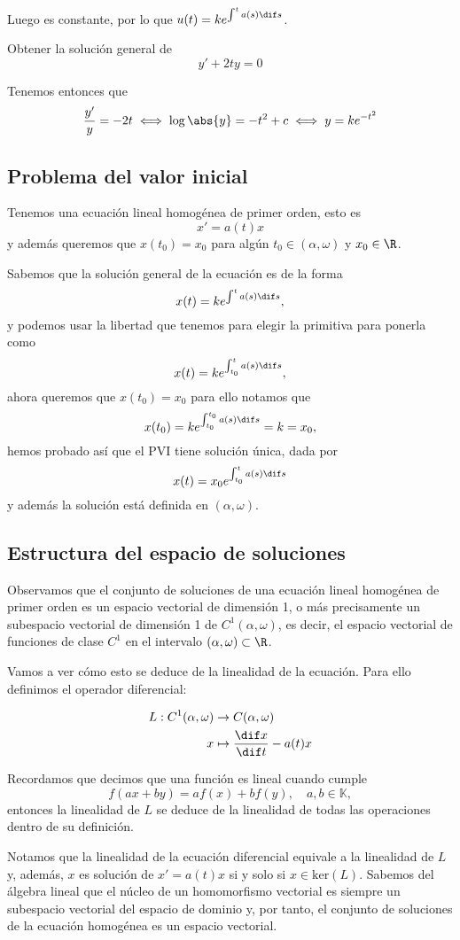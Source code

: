\documentclass[../main.tex]{subfiles}
\begin{document}
Luego es constante, por lo que \(u(t) = k e^{\int^t a(s) \dif s}\).

\begin{example}
	Obtener la solución general de
	\[y' + 2ty = 0\]
\end{example}

\begin{solution}
	Tenemos entonces que
	\[\frac{y'}{y} = -2t \iff \log\abs{y} = -t^2 + c \iff y = k e^{-t^2}\]
\end{solution}

\subsection{Problema del valor inicial}

Tenemos una ecuación lineal homogénea de primer orden, esto es
\[x' = a(t)x\]
y además queremos que \(x(t_0) = x_0\) para algún \(t_0 \in (\alpha, \omega)\) y
\(x_0 \in \R\).

Sabemos que la solución general de la ecuación es de la forma
\[x(t) = k e^{\int^t a(s) \dif s},\]
y podemos usar la libertad que tenemos para elegir la primitiva para ponerla como
\[x(t) = k e^{\int_{t_0}^t a(s) \dif s},\]
ahora queremos que \(x(t_0) = x_0\) para ello notamos que
\[x(t_0) = k e^{\int_{t_0}^{t_0} a(s) \dif s} = k = x_0,\]
hemos probado así que el PVI tiene solución única, dada por
\[x(t) = x_0 e^{\int_{t_0}^t a(s) \dif s}\]
y además la solución está definida en \((\alpha, \omega)\).

\subsection{Estructura del espacio de soluciones}

Observamos que el conjunto de soluciones de una ecuación lineal homogénea de
primer orden es un espacio vectorial de dimensión 1, o más precisamente un
subespacio vectorial de dimensión 1 de \(C^1(\alpha, \omega)\), es decir, el
espacio vectorial de funciones de clase \(C^1\) en el intervalo
\((\alpha, \omega) \subset \R\).

Vamos a ver cómo esto se deduce de la linealidad de la ecuación. Para ello
definimos el operador diferencial:

\begin{align*}
  L : C^1(\alpha, \omega) &\to C(\alpha, \omega) \\
  x &\mapsto \frac{\dif x}{\dif t} - a(t)x
\end{align*}

Recordamos que decimos que una función es lineal cuando cumple
\[f(ax + by) = af(x) + bf(y), \quad a, b \in \mathbb{K},\]
entonces la linealidad de \(L\) se deduce de la linealidad de todas las
operaciones dentro de su definición.

Notamos que la linealidad de la ecuación diferencial equivale a la linealidad de
\(L\) y, además, \(x\) es solución de \(x' = a(t)x\) si y solo si
\(x \in \text{ker}(L)\). Sabemos del álgebra lineal que el núcleo de un
homomorfismo vectorial es siempre un subespacio vectorial del espacio de dominio
y, por tanto, el conjunto de soluciones de la ecuación homogénea es un espacio
vectorial.
\end{document}
